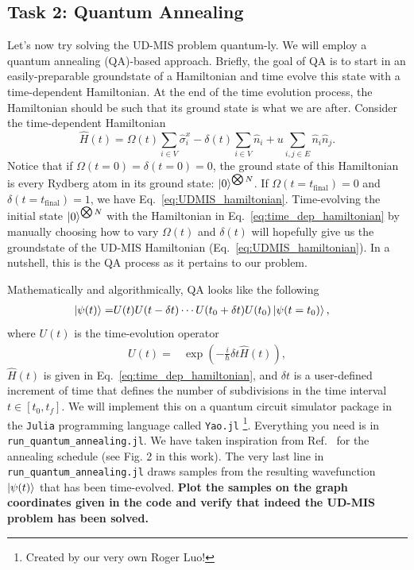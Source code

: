 \documentclass[12pt]{article}
\begin{document}
\subsection*{Task 2: Quantum Annealing}

Let's now try solving the UD-MIS problem quantum-ly.
We will employ a quantum annealing (QA)-based approach.
Briefly, the goal of QA is to start in an easily-preparable groundstate of a Hamiltonian and time evolve this state with a time-dependent Hamiltonian.
At the end of the time evolution process, the Hamiltonian should be such that its ground state is what we are after.
Consider the time-dependent Hamiltonian
\begin{equation} \label{eq:time_dep_hamiltonian}
	\hat{H}(t) = \Omega(t) \sum_{i \in V} \hat{\sigma}_i^x - \delta(t) \sum_{i \in V} \hat{n}_i + u \sum_{i,j \in E} \hat{n}_i \hat{n}_j.
\end{equation}
Notice that if $\Omega(t = 0) = \delta(t = 0) = 0$, the ground state of this Hamiltonian is every Rydberg atom in its ground state: $\ket{0}^{\bigotimes N}$.
If $\Omega(t = t_{\text{final}}) = 0$ and $\delta(t = t_{\text{final}}) = 1$, we have Eq.~\ref{eq:UDMIS_hamiltonian}.
Time-evolving the initial state $\ket{0}^{\bigotimes N}$ with the Hamiltonian in Eq.~\ref{eq:time_dep_hamiltonian} by manually choosing how to vary $\Omega(t)$ and $\delta(t)$ will hopefully give us the groundstate of the UD-MIS Hamiltonian (Eq.~\ref{eq:UDMIS_hamiltonian}).
In a nutshell, this is the QA process as it pertains to our problem.

Mathematically and algorithmically, QA looks like the following
\begin{align*}
	\ket{\psi(t)} =& U(t) U(t - \delta t) \cdots U(t_0 + \delta t) U(t_0) \ket{\psi (t = t_0)},
\end{align*}
where $U(t)$ is the time-evolution operator
\begin{align*}
	U(t) =& \exp(-\frac{i}{\hbar} \delta t \hat{H}(t)),
\end{align*}
$\hat{H}(t)$ is given in Eq.~\ref{eq:time_dep_hamiltonian}, and $\delta t$ is a user-defined increment of time that defines the number of subdivisions in the time interval $t \in [t_0, t_f]$.
We will implement this on a quantum circuit simulator package in the \texttt{Julia} programming language called \texttt{Yao.jl} \cite{luo_yaojl_2020}\footnote{Created by our very own Roger Luo!}.
Everything you need is in \texttt{run\_quantum\_annealing.jl}.
We have taken inspiration from Ref.~\cite{serret_solving_2020} for the annealing schedule (see Fig. 2 in this work).
The very last line in \texttt{run\_quantum\_annealing.jl} draws samples from the resulting wavefunction $\ket{\psi(t)}$ that has been time-evolved.
{\bf Plot the samples on the graph coordinates given in the code and verify that indeed the UD-MIS problem has been solved.}
\end{document}
